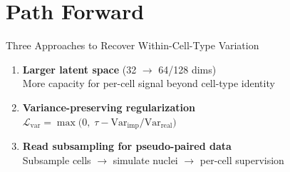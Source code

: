 \documentclass[aspectratio=169, 12pt]{beamer}
\begin{document}
\section{Path Forward}

\begin{frame}{Three Approaches to Recover Within-Cell-Type Variation}
\begin{enumerate}
    \item \textbf{Larger latent space} (32 $\to$ 64/128 dims)\\
    {\small More capacity for per-cell signal beyond cell-type identity}

    \vspace{0.3em}
    \item \textbf{Variance-preserving regularization}\\
    {\small $\mathcal{L}_{\text{var}} = \max\!\big(0,\; \tau - \text{Var}_{\text{imp}} / \text{Var}_{\text{real}}\big)$}

    \vspace{0.3em}
    \item \textbf{Read subsampling for pseudo-paired data}\\
    {\small Subsample cells $\to$ simulate nuclei $\to$ per-cell supervision}
\end{enumerate}
\end{frame}
\end{document}
